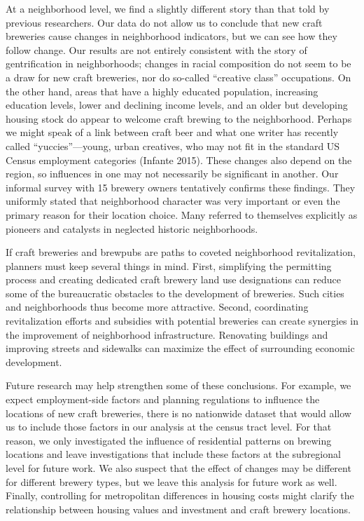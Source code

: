 \documentclass[]{article}
\begin{document}
At a neighborhood level, we find a slightly different story than that
told by previous researchers. Our data do not allow us to conclude that
new craft breweries cause changes in neighborhood indicators, but we can
see how they follow change. Our results are not entirely consistent with
the story of gentrification in neighborhoods; changes in racial
composition do not seem to be a draw for new craft breweries, nor do
so-called ``creative class'' occupations. On the other hand, areas that
have a highly educated population, increasing education levels, lower
and declining income levels, and an older but developing housing stock
do appear to welcome craft brewing to the neighborhood. Perhaps we might
speak of a link between craft beer and what one writer has recently
called ``yuccies''---young, urban creatives, who may not fit in the
standard US Census employment categories (Infante 2015). These changes
also depend on the region, so influences in one may not necessarily be
significant in another. Our informal survey with 15 brewery owners
tentatively confirms these findings. They uniformly stated that
neighborhood character was very important or even the primary reason for
their location choice. Many referred to themselves explicitly as
pioneers and catalysts in neglected historic neighborhoods.

If craft breweries and brewpubs are paths to coveted neighborhood
revitalization, planners must keep several things in mind. First,
simplifying the permitting process and creating dedicated craft brewery
land use designations can reduce some of the bureaucratic obstacles to
the development of breweries. Such cities and neighborhoods thus become
more attractive. Second, coordinating revitalization efforts and
subsidies with potential breweries can create synergies in the
improvement of neighborhood infrastructure. Renovating buildings and
improving streets and sidewalks can maximize the effect of surrounding
economic development.

Future research may help strengthen some of these conclusions. For
example, we expect employment-side factors and planning regulations to
influence the locations of new craft breweries, there is no nationwide
dataset that would allow us to include those factors in our analysis at
the census tract level. For that reason, we only investigated the
influence of residential patterns on brewing locations and leave
investigations that include these factors at the subregional level for
future work. We also suspect that the effect of changes may be different
for different brewery types, but we leave this analysis for future work
as well. Finally, controlling for metropolitan differences in housing
costs might clarify the relationship between housing values and
investment and craft brewery locations.
\end{document}

